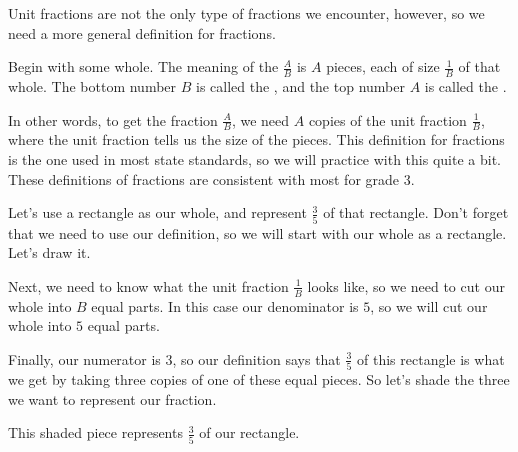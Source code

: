 \documentclass{ximera}
\begin{document}
Unit fractions are not the only type of fractions we encounter, however, so we need a more general definition for fractions.

\begin{definition}
	Begin with some whole. The meaning of the  $\frac{A}{B}$ is $A$ pieces, each of size $\frac{1}{B}$ of that whole. The bottom number $B$ is called the , and the top number $A$ is called the .
\end{definition}
In other words, to get the fraction $\frac{A}{B}$, we need $A$ copies of the unit fraction $\frac{1}{B}$, where the unit fraction tells us the size of the pieces. This definition for fractions is the one used in most state standards, so we will practice with this quite a bit. These definitions of fractions are consistent with most  for grade 3.

\begin{example}
Let's use a rectangle as our whole, and represent $\frac{3}{5}$ of that rectangle. Don't forget that we need to use our definition, so we will start with our whole as a rectangle. Let's draw it.

\begin{image}
\end{image}

Next, we need to know what the unit fraction $\frac{1}{B}$ looks like, so we need to cut our whole into $B$ equal parts. In this case our denominator is $5$, so we will cut our whole into $5$ equal parts.

\begin{image}
\end{image}

Finally, our numerator is $3$, so our definition says that $\frac{3}{5}$ of this rectangle is what we get by taking three copies of one of these equal pieces. So let's shade the three we want to represent our fraction.

\begin{image}
\end{image}

This shaded piece represents $\frac{3}{5}$ of our rectangle.

\end{example}
\end{document}
